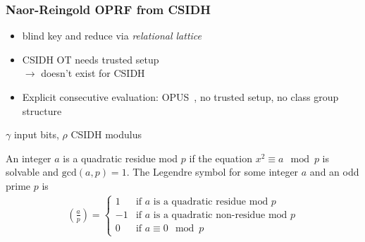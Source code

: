 \documentclass[aspectratio=169, 12pt,handout]{beamer}
\begin{document}
\begin{frame}\frametitle{Naor-Reingold OPRF from CSIDH}
  \begin{itemize}
    \item blind key and reduce via \emph{relational
      lattice}~\cite{ASIACCS:HHMRR24,PKC:DelPed24}\pause
    \item CSIDH OT needs trusted setup \pause \\ $\rightarrow$ doesn't exist for
      CSIDH\pause
    \item Explicit consecutive evaluation: OPUS~\cite{ASIACCS:HHMRR24}, no
      trusted setup, no class group structure\pause
  \end{itemize}

  \centering
  
  \vspace{1em}

  $\gamma$ input bits, $\rho$ CSIDH modulus
\end{frame}


\begin{frame}
  \begin{definition}
    An integer $a$ is a quadratic residue mod $p$ if the equation $x^2\equiv a
    \mod p$ is solvable and $\text{gcd}(a,p)=1$.
    The Legendre symbol for some integer $a$ and an odd prime $p$ is
    \begin{align*}
      \left(\frac{a}{p}\right)=\begin{cases} 
        1 & \text{if } a \text{ is a quadratic residue mod } p\\
        -1 & \text{if } a \text{ is a quadratic non-residue mod } p\\
        0 & \text{if } a \equiv 0 \mod p
      \end{cases}
    \end{align*}
  \end{definition}
\end{frame}

\end{document}
